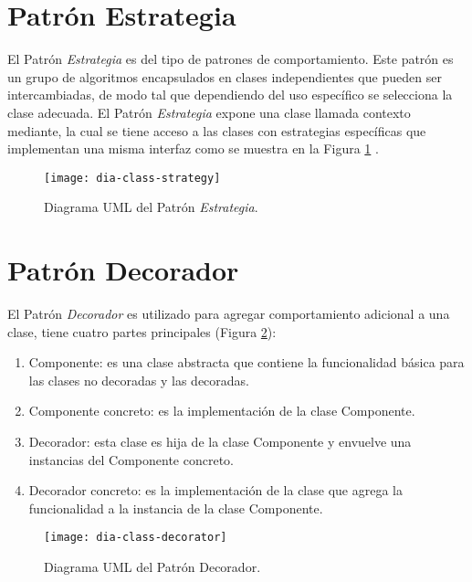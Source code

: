 \section{Patrón Estrategia}\label{sec:strategy}
El Patrón \textit{Estrategia} es del tipo de patrones de comportamiento. Este patrón es un grupo de algoritmos encapsulados en clases independientes que pueden ser intercambiadas, de modo tal que dependiendo del uso específico se selecciona la clase adecuada. El Patrón \textit{Estrategia} expone una clase llamada contexto mediante, la cual se tiene acceso a las clases con estrategias específicas que implementan una misma interfaz como se muestra en la Figura \ref{fig:dia-class-strategy} \cite{DesignPatternsLasater, DesignPatterns}.

\begin{figure}[h]
  \centering
  \texttt{[image: dia-class-strategy]}
  \caption{Diagrama UML del Patrón \textit{Estrategia}\cite{DesignPatternsLasater}.}
  \label{fig:dia-class-strategy}
\end{figure}

\section{Patrón Decorador}\label{sec:decorator}
El Patrón \textit{Decorador} es utilizado para agregar comportamiento adicional a una clase, tiene cuatro partes principales\cite{DesignPatternsLasater} (Figura \ref{fig:dia-class-decorator}):
\begin{enumerate}
  \item Componente: es una clase abstracta que contiene la funcionalidad básica para las clases no decoradas y las decoradas.
  \item Componente concreto: es la implementación de la clase Componente.
  \item Decorador: esta clase es hija de la clase Componente y envuelve una instancias del Componente concreto.
  \item Decorador concreto: es la implementación de la clase que agrega la funcionalidad a la instancia de la clase Componente.
\end{enumerate}

\begin{figure}[h]
  \centering
  \texttt{[image: dia-class-decorator]}
  \caption{Diagrama UML del Patrón Decorador\cite{DesignPatternsLasater}.}
  \label{fig:dia-class-decorator}
\end{figure}

